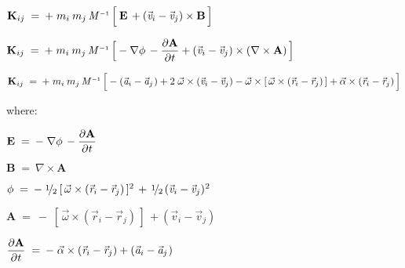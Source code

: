 \documentclass[10pt]{article}
\newcommand{\med}{\raise.5ex\hbox{$\scriptstyle 1$}\kern-.15em/\kern-.09em\lower.25ex\hbox{$\scriptstyle 2$}}
\begin{document}
\par \bigskip ${\mathbf{K}}_{\hspace{+0.009em}ij} \;=\: + \; m_i \: m_j \, {\mathit{M}}^{\scriptscriptstyle -1} \, \Big[ \: {\mathbf{E}} \, + ({\vec{\mathit{v}}}_{i} - {\vec{\mathit{v}}}_{j}) \times {\mathbf{B}} \, \Big]$

\par \bigskip ${\mathbf{K}}_{\hspace{+0.009em}ij} \;=\: + \; m_i \: m_j \, {\mathit{M}}^{\scriptscriptstyle -1} \, \Big[ - \nabla \phi \, - \dfrac{\partial{\mathbf{A}}}{\partial{\hspace{+0.03em}t}} + ({\vec{\mathit{v}}}_{i} - {\vec{\mathit{v}}}_{j}) \times (\nabla \times {\mathbf{A}}) \, \Big]$

\par \bigskip ${\mathbf{K}}_{\hspace{+0.009em}ij} \;=\: + \; m_i \: m_j \, {\mathit{M}}^{\scriptscriptstyle -1} \, \Big[ - ({\vec{\mathit{a}}}_{i} - {\vec{\mathit{a}}}_{j}\hspace{+0.06em}) + 2 \; {\vec{\omega}} \times ({\vec{\mathit{v}}}_{i} - {\vec{\mathit{v}}}_{j}) - {\vec{\omega}} \times [ \, {\vec{\omega}} \times ({\vec{\mathit{r}}}_{i} - {\vec{\mathit{r}}}_{j}) \, ] + {\vec{\alpha}} \times ({\vec{\mathit{r}}}_{i} - {\vec{\mathit{r}}}_{j}) \, \Big]$

\par \bigskip \noindent where:

\par \bigskip ${\mathbf{E}} \;=\: - \; \nabla \phi \, - \dfrac{\partial{\mathbf{A}}}{\partial{\hspace{+0.03em}t}}$

\par \bigskip ${\mathbf{B}} \;=\: \nabla \times {\mathbf{A}}$

\par \bigskip $\phi \;=\: - \; \med \: [ \, {\vec{\omega}} \times ({\vec{\mathit{r}}}_{i} - {\vec{\mathit{r}}}_{j}) \, ]^{\hspace{+0.006em}2} \, + \, \med \, ( {\vec{\mathit{v}}}_{i} - {\vec{\mathit{v}}}_{j})^{\hspace{+0.03em}2}$

\par \bigskip ${\mathbf{A}} \;=\: - \; [ \, {\vec{\omega}} \times ({\vec{\mathit{r}}}_{i} - {\vec{\mathit{r}}}_{j}) \, ] \, + ( {\vec{\mathit{v}}}_{i} - {\vec{\mathit{v}}}_{j})$

\par \bigskip $\dfrac{\partial{\mathbf{A}}}{\partial{\hspace{+0.03em}t}} \;=\: - \; {\vec{\alpha}} \times ({\vec{\mathit{r}}}_{i} - {\vec{\mathit{r}}}_{j}) + ( {\vec{\mathit{a}}}_{i} - {\vec{\mathit{a}}}_{j}\hspace{+0.06em})$
\end{document}
